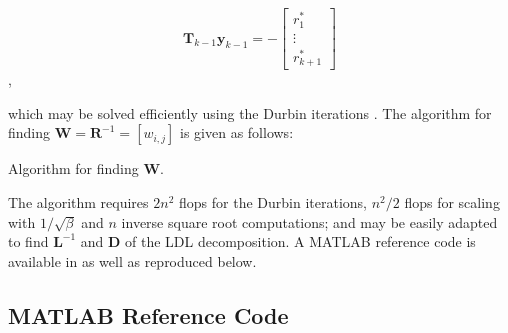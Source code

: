 $$\boldsymbol{T}_{k-1} \boldsymbol{y}_{k-1} = - \begin{bmatrix} r^*_1 \\ \vdots \\ r^*_{k+1} \end{bmatrix}$$,

which may be solved efficiently using the Durbin iterations \cite{Golub2012}. The algorithm for finding $\boldsymbol{W} = \boldsymbol{R}^{-1} = [w_{i,j}]$ is given as follows:

\begin{algorithm}[H]
\caption{Algorithm for finding $\boldsymbol{W}.$}
\begin{algorithmic}[1]
	\EndFor
\end{algorithmic}
\end{algorithm}

The algorithm requires $2n^2$ flops \cite[Algorithm 4.7.1]{Golub2012} for the Durbin iterations, $n^2/2$ flops for scaling with $1/\sqrt\beta$ and $n$ inverse square root computations; and may be easily adapted to find $\boldsymbol{L}^{-1}$ and $\boldsymbol{D}$ of the LDL decomposition. A MATLAB reference code is available in \cite{KrishnamoorthyMathWorks2015} as well as reproduced below.

\subsection{MATLAB Reference Code}


